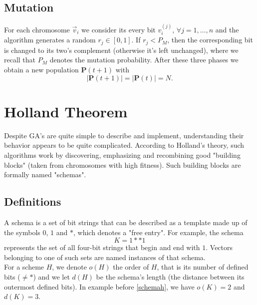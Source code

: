 \documentclass[%
    corpo=11pt,
    twoside,
    stile=classica,
    oldstyle,
    autoretitolo,
    tipotesi=magistrale,
    greek,
    evenboxes,
    english
]{toptesi}
\begin{document}
\subsection{Mutation}
For each chromosome $\vec{v}_i$ we consider its every bit $v_i^{(j)}$, $\forall j=1,\dots,n$ and the algorithm generates a random $r_j \in \left[0,1\right]$.
If $r_j < P_M$, then the corresponding bit is changed to its two's complement (otherwise it's left unchanged), where we recall that $P_M$ denotes the mutation probability. After these three phases we obtain a new population $\textbf{P}(t+1)$ with 
\begin{equation}
|\textbf{P}(t+1)|=|\textbf{P}(t)|=N.
\end{equation}

\section{Holland Theorem}
Despite GA's are quite simple to describe and implement, understanding their behavior appears to be quite complicated. According to Holland's theory, such algorithms work by discovering, emphasizing and recombining good "building blocks" (taken from chromosomes with high fitness). Such building blocks are formally named "schemas". 
\subsection{Definitions}
A schema is a set of bit strings that can be described as a template made up of the symbols $0$, $1$ and $*$, which denotes a "free entry". For example, the schema
\begin{equation}
\label{schemah}
K = 1**1
\end{equation}
represents the set of all four-bit strings that begin and end with $1$. Vectors belonging to one of such sets are named instances of that schema. \\
For a scheme $H$, we denote $o(H)$ the order of $H$, that is its number of defined bits ($\neq *$) and we let $d(H)$ be the schema's length (the distance between its outermost defined bits). In example before \eqref{schemah}, we have $o(K)=2$ and $d(K)=3$.
\end{document}
